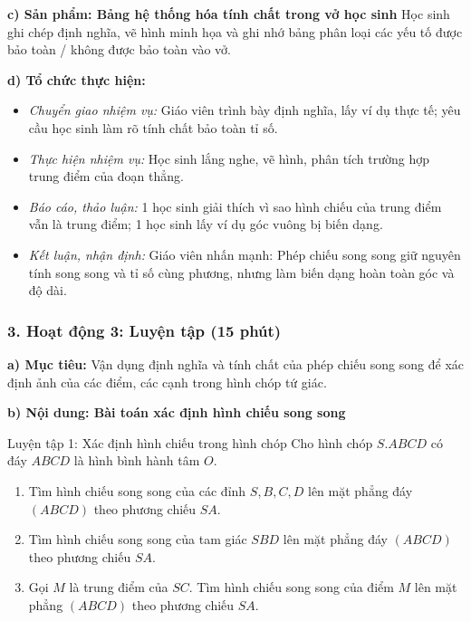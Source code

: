 \documentclass[12pt, a4paper]{article}
\begin{document}
\noindent \textbf{c) Sản phẩm: Bảng hệ thống hóa tính chất trong vở học sinh}
Học sinh ghi chép định nghĩa, vẽ hình minh họa và ghi nhớ bảng phân loại các yếu tố được bảo toàn / không được bảo toàn vào vở.

\noindent \textbf{d) Tổ chức thực hiện:}
\begin{itemize}[leftmargin=0.8cm]
    \item \textit{Chuyển giao nhiệm vụ:} Giáo viên trình bày định nghĩa, lấy ví dụ thực tế; yêu cầu học sinh làm rõ tính chất bảo toàn tỉ số.
    \item \textit{Thực hiện nhiệm vụ:} Học sinh lắng nghe, vẽ hình, phân tích trường hợp trung điểm của đoạn thẳng.
    \item \textit{Báo cáo, thảo luận:} 1 học sinh giải thích vì sao hình chiếu của trung điểm vẫn là trung điểm; 1 học sinh lấy ví dụ góc vuông bị biến dạng.
    \item \textit{Kết luận, nhận định:} Giáo viên nhấn mạnh: Phép chiếu song song giữ nguyên tính song song và tỉ số cùng phương, nhưng làm biến dạng hoàn toàn góc và độ dài.
\end{itemize}

\subsubsection*{3. Hoạt động 3: Luyện tập (15 phút)}

\noindent \textbf{a) Mục tiêu:}
Vận dụng định nghĩa và tính chất của phép chiếu song song để xác định ảnh của các điểm, các cạnh trong hình chóp tứ giác.

\noindent \textbf{b) Nội dung: Bài toán xác định hình chiếu song song}
\begin{pedabox}{Luyện tập 1: Xác định hình chiếu trong hình chóp}
Cho hình chóp $S.ABCD$ có đáy $ABCD$ là hình bình hành tâm $O$.
\begin{enumerate}[leftmargin=0.6cm]
    \item Tìm hình chiếu song song của các đỉnh $S, B, C, D$ lên mặt phẳng đáy $(ABCD)$ theo phương chiếu $SA$.
    \item Tìm hình chiếu song song của tam giác $SBD$ lên mặt phẳng đáy $(ABCD)$ theo phương chiếu $SA$.
    \item Gọi $M$ là trung điểm của $SC$. Tìm hình chiếu song song của điểm $M$ lên mặt phẳng $(ABCD)$ theo phương chiếu $SA$.
\end{enumerate}
\end{pedabox}
\end{document}
